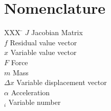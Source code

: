 \section*{Nomenclature}

\begin{tabbing}
  XXX \= \kill%
  $J$ \> Jacobian Matrix \\
  $f$ \> Residual value vector \\
  $x$ \> Variable value vector \\
  $F$ \> Force \\
  $m$ \> Mass \\
  $\Delta x$ \> Variable displacement vector \\
  $\alpha$ \> Acceleration \\
  $_i$ \> Variable number \\
 \end{tabbing}
